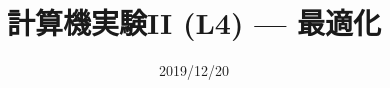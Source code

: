 \documentclass[dvipdfmx]{beamer}
\title{計算機実験II (L4) --- 最適化}
\date{2019/12/20}
\begin{document}
\begin{frame}
  \titlepage
  \tableofcontents
\end{frame}












\end{document}
